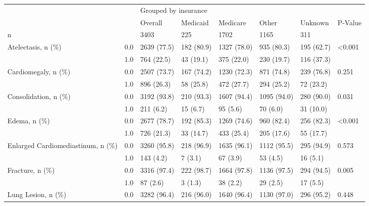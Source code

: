 \begin{tabular}{llllllll}
\toprule
                       &     & \multicolumn{6}{l}{Grouped by insurance} \\
                       &     &              Overall &    Medicaid &     Medicare &        Other &     Unknown & P-Value \\
\midrule
n & {} &                 3403 &         225 &         1702 &         1165 &         311 &         \\
Atelectasis, n (\%) & 0.0 &          2639 (77.5) &  182 (80.9) &  1327 (78.0) &   935 (80.3) &  195 (62.7) &  <0.001 \\
                       & 1.0 &           764 (22.5) &   43 (19.1) &   375 (22.0) &   230 (19.7) &  116 (37.3) &         \\
Cardiomegaly, n (\%) & 0.0 &          2507 (73.7) &  167 (74.2) &  1230 (72.3) &   871 (74.8) &  239 (76.8) &   0.251 \\
                       & 1.0 &           896 (26.3) &   58 (25.8) &   472 (27.7) &   294 (25.2) &   72 (23.2) &         \\
Consolidation, n (\%) & 0.0 &          3192 (93.8) &  210 (93.3) &  1607 (94.4) &  1095 (94.0) &  280 (90.0) &   0.031 \\
                       & 1.0 &            211 (6.2) &    15 (6.7) &     95 (5.6) &     70 (6.0) &   31 (10.0) &         \\
Edema, n (\%) & 0.0 &          2677 (78.7) &  192 (85.3) &  1269 (74.6) &   960 (82.4) &  256 (82.3) &  <0.001 \\
                       & 1.0 &           726 (21.3) &   33 (14.7) &   433 (25.4) &   205 (17.6) &   55 (17.7) &         \\
Enlarged Cardiomediastinum, n (\%) & 0.0 &          3260 (95.8) &  218 (96.9) &  1635 (96.1) &  1112 (95.5) &  295 (94.9) &   0.573 \\
                       & 1.0 &            143 (4.2) &     7 (3.1) &     67 (3.9) &     53 (4.5) &    16 (5.1) &         \\
Fracture, n (\%) & 0.0 &          3316 (97.4) &  222 (98.7) &  1664 (97.8) &  1136 (97.5) &  294 (94.5) &   0.005 \\
                       & 1.0 &             87 (2.6) &     3 (1.3) &     38 (2.2) &     29 (2.5) &    17 (5.5) &         \\
Lung Lesion, n (\%) & 0.0 &          3282 (96.4) &  216 (96.0) &  1640 (96.4) &  1130 (97.0) &  296 (95.2) &   0.448 \\

\end{tabular}
